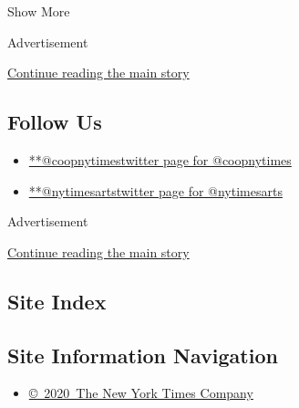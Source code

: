 Show More

Advertisement

\protect\hyperlink{after-mid2}{Continue reading the main story}

\hypertarget{follow-us}{%
\subsection{Follow Us}\label{follow-us}}

\begin{itemize}
\tightlist
\item
  \href{https://twitter.com/coopnytimes}{**@coopnytimestwitter page for
  @coopnytimes}
\item
  \href{https://twitter.com/nytimesarts}{**@nytimesartstwitter page for
  @nytimesarts}
\end{itemize}

Advertisement

\protect\hyperlink{after-mktg}{Continue reading the main story}

\hypertarget{site-index}{%
\subsection{Site Index}\label{site-index}}

\hypertarget{site-information-navigation}{%
\subsection{Site Information
Navigation}\label{site-information-navigation}}

\begin{itemize}
\tightlist
\item
  \href{https://help.nytimes.com/hc/en-us/articles/115014792127-Copyright-notice}{©~2020~The
  New York Times Company}
\end{itemize}

